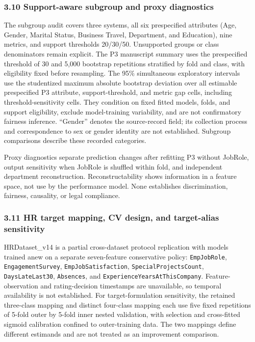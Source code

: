 \documentclass[
  a4paper,
  review]{elsarticle}
\begin{document}
\subsubsection{3.10 Support-aware subgroup and proxy
diagnostics}\label{support-aware-subgroup-and-proxy-diagnostics}

The subgroup audit covers three systems, all six prespecified attributes
(Age, Gender, Marital Status, Business Travel, Department, and
Education), nine metrics, and support thresholds 20/30/50. Unsupported
groups or class denominators remain explicit. The P3 manuscript summary
uses the prespecified threshold of 30 and 5,000 bootstrap repetitions
stratified by fold and class, with eligibility fixed before resampling.
The 95\% simultaneous exploratory intervals use the studentized maximum
absolute bootstrap deviation over all estimable prespecified P3
attribute, support-threshold, and metric gap cells, including
threshold-sensitivity cells. They condition on fixed fitted models,
folds, and support eligibility, exclude model-training variability, and
are not confirmatory fairness inference. ``Gender'' denotes the
source-record field; its collection process and correspondence to sex or
gender identity are not established. Subgroup comparisons describe these
recorded categories.

Proxy diagnostics separate prediction changes after refitting P3 without
JobRole, output sensitivity when JobRole is shuffled within fold, and
independent department reconstruction. Reconstructability shows
information in a feature space, not use by the performance model. None
establishes discrimination, fairness, causality, or legal compliance.

\subsubsection{3.11 HR target mapping, CV design, and target-alias
sensitivity}\label{hr-target-mapping-cv-design-and-target-alias-sensitivity}

HRDataset\_v14 is a partial cross-dataset protocol replication with
models trained anew on a separate seven-feature conservative policy:
\texttt{EmpJobRole}, \texttt{EngagementSurvey},
\texttt{EmpJobSatisfaction}, \texttt{SpecialProjectsCount},
\texttt{DaysLateLast30}, \texttt{Absences}, and
\texttt{ExperienceYearsAtThisCompany}. Feature-observation and
rating-decision timestamps are unavailable, so temporal availability is
not established. For target-formulation sensitivity, the retained
three-class mapping and distinct four-class mapping each use five fixed
repetitions of 5-fold outer by 5-fold inner nested validation, with
selection and cross-fitted sigmoid calibration confined to
outer-training data. The two mappings define different estimands and are
not treated as an improvement comparison.
\end{document}
